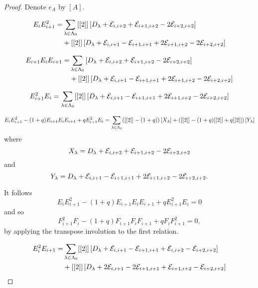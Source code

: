 \documentclass[a4paper, 11pt]{report}
\begin{document}
\begin{proof}
Denote $e_A$ by $\left[A\right]$.

\begin{align*}
E_i E_{i+1}^2 = &\sum_{\lambda\in\Lambda_0{}} [[2]]\left[D_\lambda +\mathcal{E}_{i,i+2} +\mathcal{E}_{i+1,i+2} -2\mathcal{E}_{i+2,i+2}\right]\\
&+[[2]]\left[D_\lambda +\mathcal{E}_{i,i+1} -\mathcal{E}_{i+1,i+1} +2\mathcal{E}_{i+1,i+2} - 2\mathcal{E}_{i+2,i+2}\right]
\end{align*}

\begin{align*}
E_{i+1}E_i E_{i+1} = &\sum_{\lambda\in\Lambda_0{}} \left[D_\lambda +\mathcal{E}_{i,i+2} +\mathcal{E}_{i+1,i+2} - 2\mathcal{E}_{i+2,i+2}\right]\\
&+[[2]]\left[D_\lambda +\mathcal{E}_{i,i+1} -\mathcal{E}_{i+1,i+1} +2\mathcal{E}_{i+1,i+2} -2\mathcal{E}_{i+2,i+2}\right]
\end{align*}

\begin{equation*}
E_{i+1}^2 E_i = \sum_{\lambda\in\Lambda_0{}} [[2]]\left[D_\lambda +\mathcal{E}_{i,i+1} -\mathcal{E}_{i+1,i+1} +2\mathcal{E}_{i+1,i+2} -2\mathcal{E}_{i+2,i+2}\right]
\end{equation*}

\begin{equation*}
E_i E_{i+1}^2 - (1+q)E_{i+1} E_i E_{i+1} + qE_{i+1}^2 E_i = \sum_{\lambda\in\Lambda_0{}} ([[2]] -(1+q))\left[X_\lambda\right] + ([[2]] -(1+q)[[2]] +q[[2]])\left[Y_\lambda\right]
\end{equation*}
where
\begin{equation*}
X_\lambda=D_\lambda +\mathcal{E}_{i,i+2} +\mathcal{E}_{i+1,i+2} -2\mathcal{E}_{i+2,i+2}
\end{equation*}
and
\begin{equation*}
Y_\lambda=D_\lambda +\mathcal{E}_{i,i+1} -\mathcal{E}_{i+1,i+1} +2\mathcal{E}_{i+1,i+2} -2\mathcal{E}_{i+2,i+2}.
\end{equation*}

It follows
\begin{equation*}
E_i E_{i+1}^2 -(1+q)E_{i+1} E_i E_{i+1} +qE_{i+1}^2 E_i = 0
\end{equation*}
and so
\begin{equation*}
F_{i+1}^2F_i -(1+q)F_{i+1}F_iF_{i+1} +qF_iF_{i+1}^2 = 0,
\end{equation*}
by applying the transpose involution to the first relation.

\begin{align*}
E_i^2E_{i+1} = &\sum_{\lambda\in\Lambda_0{}} [[2]]\left[D_\lambda +\mathcal{E}_{i,i+1} -\mathcal{E}_{i+1,i+1} +\mathcal{E}_{i,i+2} -\mathcal{E}_{i+2,i+2}\right]\\
&+[[2]]\left[D_\lambda +2\mathcal{E}_{i,i+1} -2\mathcal{E}_{i+1,i+1} +\mathcal{E}_{i+1,i+2} - \mathcal{E}_{i+2,i+2}\right]
\end{align*}


\end{proof}
\end{document}
